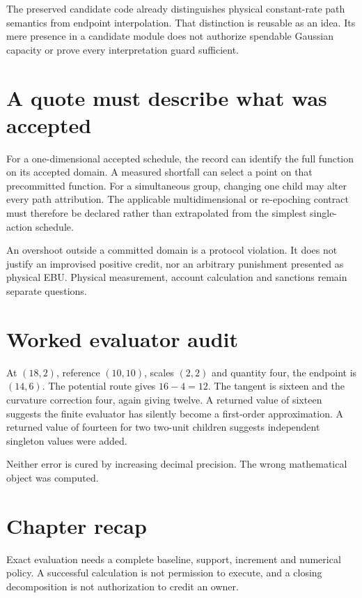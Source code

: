 The preserved candidate code already distinguishes physical constant-rate
path semantics from endpoint interpolation. That distinction is reusable
as an idea. Its mere presence in a candidate module does not authorize
spendable Gaussian capacity or prove every interpretation guard sufficient.

\section{A quote must describe what was accepted}
For a one-dimensional accepted schedule, the record can identify the full
function on its accepted domain. A measured shortfall can select a point
on that precommitted function. For a simultaneous group, changing one child
may alter every path attribution. The applicable multidimensional or
re-epoching contract must therefore be declared rather than extrapolated
from the simplest single-action schedule.

An overshoot outside a committed domain is a protocol violation. It does
not justify an improvised positive credit, nor an arbitrary punishment
presented as physical EBU. Physical measurement, account calculation and
sanctions remain separate questions.

\section*{Worked evaluator audit}
At $(18,2)$, reference $(10,10)$, scales $(2,2)$ and quantity four,
the endpoint is $(14,6)$. The potential route gives $16-4=12$.
The tangent is sixteen and the curvature correction four, again giving
twelve. A returned value of sixteen suggests the finite evaluator has
silently become a first-order approximation. A returned value of fourteen
for two two-unit children suggests independent singleton values were added.

Neither error is cured by increasing decimal precision. The wrong
mathematical object was computed.

\section*{Chapter recap}
Exact evaluation needs a complete baseline, support, increment and numerical
policy. A successful calculation is not permission to execute, and a closing
decomposition is not authorization to credit an owner.
